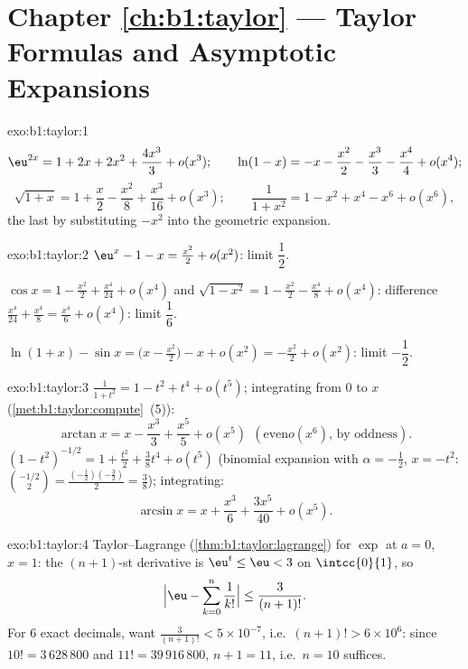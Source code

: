 \section*{Chapter \ref{ch:b1:taylor} --- Taylor Formulas and Asymptotic
Expansions}

\begin{solution}{exo:b1:taylor:1}
\[
\eu^{2x} = 1 + 2x + 2x^2 + \frac{4x^3}{3} + o(x^3);
\qquad
\ln(1 - x) = -x - \frac{x^2}{2} - \frac{x^3}{3} - \frac{x^4}{4} +
o(x^4);
\]
\[
\sqrt{1+x} = 1 + \frac x2 - \frac{x^2}{8} + \frac{x^3}{16} + o(x^3);
\qquad
\frac{1}{1 + x^2} = 1 - x^2 + x^4 - x^6 + o(x^6),
\]
the last by substituting $-x^2$ into the geometric expansion.
\end{solution}

\begin{solution}{exo:b1:taylor:2}
$\eu^x - 1 - x = \frac{x^2}{2} + o(x^2)$: limit $\dfrac12$.

$\cos x = 1 - \frac{x^2}{2} + \frac{x^4}{24} + o(x^4)$ and
$\sqrt{1 - x^2} = 1 - \frac{x^2}{2} - \frac{x^4}{8} + o(x^4)$:
difference $\frac{x^4}{24} + \frac{x^4}{8} = \frac{x^4}{6} + o(x^4)$:
limit $\dfrac16$.

$\ln(1+x) - \sin x = \bigl(x - \frac{x^2}{2}\bigr) - x + o(x^2) =
-\frac{x^2}{2} + o(x^2)$: limit $-\dfrac12$.
\end{solution}

\begin{solution}{exo:b1:taylor:3}
$\frac{1}{1+t^2} = 1 - t^2 + t^4 + o(t^5)$; integrating from $0$ to
$x$ (\cref{met:b1:taylor:compute}~(5)):
\[
\arctan x = x - \frac{x^3}{3} + \frac{x^5}{5} + o(x^5)\ \ (\text{even
}o(x^6)\text{, by oddness}).
\]
$(1 - t^2)^{-1/2} = 1 + \frac{t^2}{2} + \frac38 t^4 + o(t^5)$ (binomial
expansion with $\alpha = -\frac12$, $x = -t^2$:
$\binom{-1/2}{2} = \frac{(-\frac12)(-\frac32)}{2} = \frac38$);
integrating:
\[
\arcsin x = x + \frac{x^3}{6} + \frac{3x^5}{40} + o(x^5) .
\]
\end{solution}

\begin{solution}{exo:b1:taylor:4}
Taylor--Lagrange (\cref{thm:b1:taylor:lagrange}) for $\exp$ at $a =
0$, $x = 1$: the $(n+1)$-st derivative is $\eu^t \leq \eu < 3$ on
$\intcc{0}{1}$, so
\[
\Bigl|\eu - \sum_{k=0}^{n} \frac{1}{k!}\Bigr| \leq
\frac{3}{(n+1)!} .
\]
For $6$ exact decimals, want $\frac{3}{(n+1)!} < 5\times 10^{-7}$,
i.e.\ $(n+1)! > 6\times 10^{6}$: since $10! = 3\,628\,800$ and $11! =
39\,916\,800$, $n + 1 = 11$, i.e.\ $n = 10$ suffices.
\end{solution}

